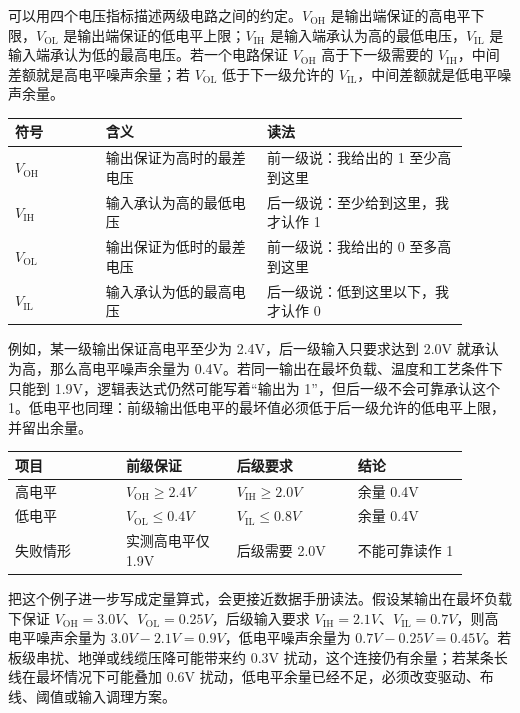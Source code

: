 可以用四个电压指标描述两级电路之间的约定。$V_\mathrm{OH}$ 是输出端保证的高电平下限，$V_\mathrm{OL}$ 是输出端保证的低电平上限；$V_\mathrm{IH}$ 是输入端承认为高的最低电压，$V_\mathrm{IL}$ 是输入端承认为低的最高电压。若一个电路保证 $V_\mathrm{OH}$ 高于下一级需要的 $V_\mathrm{IH}$，中间差额就是高电平噪声余量；若 $V_\mathrm{OL}$ 低于下一级允许的 $V_\mathrm{IL}$，中间差额就是低电平噪声余量。

\begin{longtable}{L{0.18\linewidth}L{0.32\linewidth}L{0.4\linewidth}}
\toprule
符号 & 含义 & 读法 \\
\midrule
$V_\mathrm{OH}$ & 输出保证为高时的最差电压 & 前一级说：我给出的 1 至少高到这里 \\
$V_\mathrm{IH}$ & 输入承认为高的最低电压 & 后一级说：至少给到这里，我才认作 1 \\
$V_\mathrm{OL}$ & 输出保证为低时的最差电压 & 前一级说：我给出的 0 至多高到这里 \\
$V_\mathrm{IL}$ & 输入承认为低的最高电压 & 后一级说：低到这里以下，我才认作 0 \\
\bottomrule
\end{longtable}

例如，某一级输出保证高电平至少为 2.4V，后一级输入只要求达到 2.0V 就承认为高，那么高电平噪声余量为 0.4V。若同一输出在最坏负载、温度和工艺条件下只能到 1.9V，逻辑表达式仍然可能写着“输出为 1”，但后一级不会可靠承认这个 1。低电平也同理：前级输出低电平的最坏值必须低于后一级允许的低电平上限，并留出余量。

\begin{longtable}{L{0.22\linewidth}L{0.22\linewidth}L{0.24\linewidth}L{0.22\linewidth}}
\toprule
项目 & 前级保证 & 后级要求 & 结论 \\
\midrule
高电平 & $V_\mathrm{OH} \ge 2.4V$ & $V_\mathrm{IH} \ge 2.0V$ & 余量 0.4V \\
低电平 & $V_\mathrm{OL} \le 0.4V$ & $V_\mathrm{IL} \le 0.8V$ & 余量 0.4V \\
失败情形 & 实测高电平仅 1.9V & 后级需要 2.0V & 不能可靠读作 1 \\
\bottomrule
\end{longtable}

把这个例子进一步写成定量算式，会更接近数据手册读法。假设某输出在最坏负载下保证 $V_\mathrm{OH}=3.0V$、$V_\mathrm{OL}=0.25V$，后级输入要求 $V_\mathrm{IH}=2.1V$、$V_\mathrm{IL}=0.7V$，则高电平噪声余量为 $3.0V-2.1V=0.9V$，低电平噪声余量为 $0.7V-0.25V=0.45V$。若板级串扰、地弹或线缆压降可能带来约 0.3V 扰动，这个连接仍有余量；若某条长线在最坏情况下可能叠加 0.6V 扰动，低电平余量已经不足，必须改变驱动、布线、阈值或输入调理方案。

